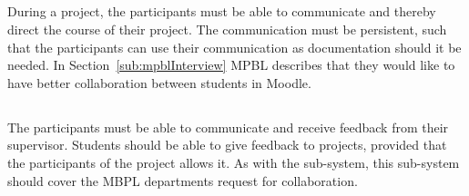 \subsection{\blackboardgroup{}} %
During a project, the participants must be able to communicate and thereby direct the course of their project. %
The communication must be persistent, such that the participants can use their communication as documentation should it be needed. %
In Section~\ref{sub:mpblInterview} MPBL describes that they would like to have better collaboration between students in Moodle.

\subsection{\supervisorgroup{}} %
The participants must be able to communicate and receive feedback from their supervisor.
Students should be able to give feedback to projects, provided that the participants of the project allows it.
As with the \blackboardgroup{} sub-system, this sub-system should cover the MBPL departments request for collaboration.


